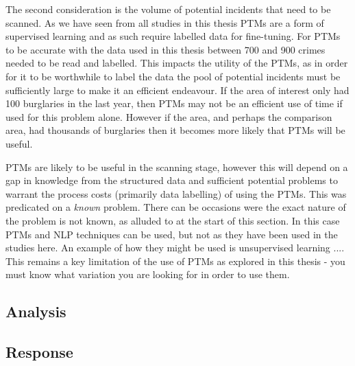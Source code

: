 The second consideration is the volume of potential incidents that need to be scanned. As we have seen from all studies in this thesis PTMs are a form of supervised learning and as such require labelled data for fine-tuning. For PTMs to be accurate with the data used in this thesis between 700 and 900 crimes needed to be read and labelled. This impacts the utility of the PTMs, as in order for it to be worthwhile to label the data the pool of potential incidents must be sufficiently large to make it an efficient endeavour. If the area of interest only had 100 burglaries in the last year, then PTMs may not be an efficient use of time if used for this problem alone. However if the area, and perhaps the comparison area, had thousands of burglaries then it becomes more likely that PTMs will be useful.

PTMs are likely to be useful in the scanning stage, however this will depend on a gap in knowledge from the structured data and sufficient potential problems to warrant the process costs (primarily data labelling) of using the PTMs.  This was predicated on a \emph{known} problem. There can be occasions were the exact nature of the problem is not known, as alluded to at the start of this section. In this case PTMs and NLP techniques can be used, but not as they have been used in the studies here. An example of how they might be used is unsupervised learning .... This remains a key limitation of the use of PTMs as explored in this thesis - you must know what variation you are looking for in order to use them.     


\subsection{Analysis}
\subsection{Response}
